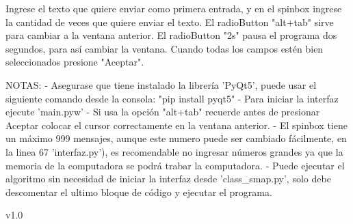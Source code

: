 Ingrese el texto que quiere enviar como primera entrada, y en el spinbox
ingrese la cantidad de veces que quiere enviar el texto. El radioButton "alt+tab"
sirve para cambiar a la ventana anterior. El radioButton "2s" pausa el programa 
dos segundos, para así cambiar la ventana. Cuando todas los campos estén bien 
seleccionados presione "Aceptar".

NOTAS:
- Asegurase que tiene instalado la librería 'PyQt5', puede usar el siguiente comando
desde la consola: "pip install pyqt5"
- Para iniciar la interfaz ejecute 'main.pyw'
- Si usa la opción "alt+tab" recuerde antes de presionar Aceptar colocar el
cursor
correctamente en la ventana anterior.
- El spinbox tiene un máximo 999 mensajes, aunque este numero puede ser cambiado 
fácilmente, en la linea 67 'interfaz.py'), es recomendable no ingresar números 
grandes ya que la memoria de la computadora se podrá trabar la computadora.
- Puede ejecutar el algoritmo sin necesidad de iniciar la interfaz desde 'class_smap.py',
solo debe descomentar el ultimo bloque de código y ejecutar el programa.

v1.0